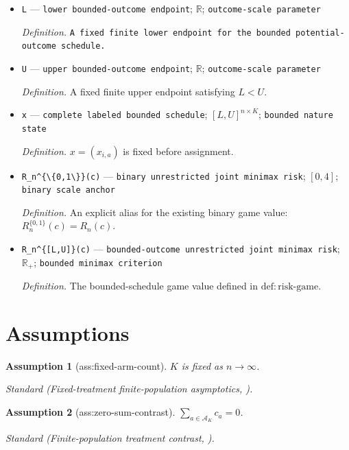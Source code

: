 \documentclass{article}
\newtheorem{assumption}{Assumption}
\begin{document}
\begin{itemize}
  \item \texttt{L} --- \texttt{lower bounded-\allowbreak{}outcome endpoint}; \(\mathbb R\); \texttt{outcome-\allowbreak{}scale parameter}
  \par\smallskip\noindent\emph{Definition.} \texttt{A fixed finite lower endpoint for the bounded potential-\allowbreak{}outcome schedule.}
  \item \texttt{U} --- \texttt{upper bounded-\allowbreak{}outcome endpoint}; \(\mathbb R\); \texttt{outcome-\allowbreak{}scale parameter}
  \par\smallskip\noindent\emph{Definition.} A fixed finite upper endpoint satisfying \(L<U\).
  \item \texttt{x} --- \texttt{complete labeled bounded schedule}; \([L,U]^{n\times K}\); \texttt{bounded nature state}
  \par\smallskip\noindent\emph{Definition.} \(x=(x_{i,a})\) is fixed before assignment.
  \item \texttt{R\_\allowbreak{}n\textasciicircum{}\{\textbackslash{}\allowbreak{}\{0,\allowbreak{}1\textbackslash{}\allowbreak{}\}\allowbreak{}\}\allowbreak{}(c)} --- \texttt{binary unrestricted joint minimax risk}; \([0,4]\); \texttt{binary scale anchor}
  \par\smallskip\noindent\emph{Definition.} An explicit alias for the existing binary game value: \(R_n^{\{0,1\}}(c)=R_n(c)\).
  \item \texttt{R\_\allowbreak{}n\textasciicircum{}\{[L,\allowbreak{}U]\}\allowbreak{}(c)} --- \texttt{bounded-\allowbreak{}outcome unrestricted joint minimax risk}; \(\mathbb R_+\); \texttt{bounded minimax criterion}
  \par\smallskip\noindent\emph{Definition.} The bounded-schedule game value defined in \(\mathrm{def:risk\text{-}game}\).
\end{itemize}

\section{Assumptions}

\begin{assumption}[ass:fixed-arm-count]\label{ass:fixed-arm-count}
\(K\) is fixed as \(n\to\infty\).
\par\smallskip\noindent\emph{Standard} (Fixed-treatment finite-population asymptotics, \cite{LiDing2017}).
\end{assumption}

\begin{assumption}[ass:zero-sum-contrast]\label{ass:zero-sum-contrast}
\(\sum_{a\in\mathcal A_K}c_a=0\).
\par\smallskip\noindent\emph{Standard} (Finite-population treatment contrast, \cite{DasguptaPillaiRubin2015}).
\end{assumption}
\end{document}
